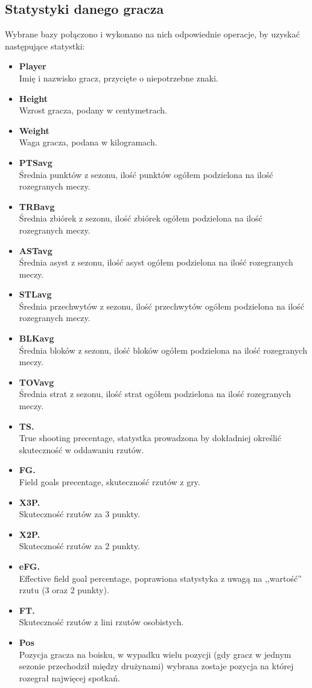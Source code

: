 \documentclass[twoside,twocolumn]{article}
\begin{document}
\subsection{Statystyki danego gracza}
Wybrane bazy połączono i wykonano na nich odpowiednie operacje, by uzyskać następujące statystki:
\begin{itemize}
\item \textbf{Player}\\
Imię i nazwisko gracz, przycięte o niepotrzebne znaki.
\item \textbf{Height}\\
Wzrost gracza, podany w centymetrach.
\item \textbf{Weight}\\
Waga gracza, podana w kilogramach.
\item \textbf{PTSavg}\\
Średnia punktów z sezonu, ilość punktów ogółem podzielona na ilość rozegranych meczy.
\item \textbf{TRBavg}\\
Średnia zbiórek z sezonu, ilość zbiórek ogółem podzielona na ilość rozegranych meczy.
\item \textbf{ASTavg}\\
Średnia asyst z sezonu, ilość asyst ogółem podzielona na ilość rozegranych meczy.
\item \textbf{STLavg}\\
Średnia przechwytów z sezonu, ilość przechwytów ogółem podzielona na ilość rozegranych meczy.
\item \textbf{BLKavg}\\
Średnia bloków z sezonu, ilość bloków ogółem podzielona na ilość rozegranych meczy.
\item \textbf{TOVavg}\\
Średnia strat z sezonu, ilość strat ogółem podzielona na ilość rozegranych meczy.
\item \textbf{TS.}\\
True shooting precentage, statystka prowadzona by dokładniej określić skuteczność w oddawaniu rzutów.
\item \textbf{FG.}\\
Field goals precentage, skuteczność rzutów z gry.
\item \textbf{X3P.}\\
Skuteczność rzutów za 3 punkty.
\item \textbf{X2P.}\\
Skuteczność rzutów za 2 punkty.
\item \textbf{eFG.}\\
Effective field goal percentage, poprawiona statystyka z uwagą na ,,wartość'' rzutu (3 oraz 2 punkty).
\item \textbf{FT.}\\
Skuteczność rzutów z lini rzutów osobistych.
\item \textbf{Pos}\\
Pozycja gracza na boisku, w wypadku wielu pozycji (gdy gracz w jednym sezonie przechodził między drużynami) wybrana zostaje pozycja na której rozegrał najwięcej spotkań.
\end{itemize}
\end{document}
